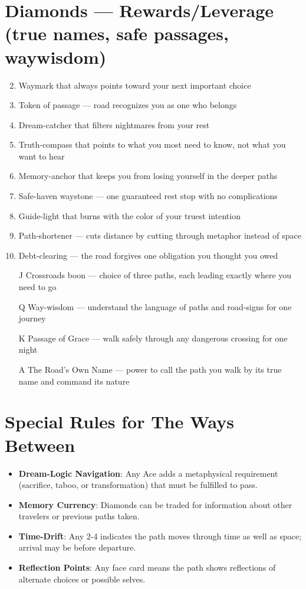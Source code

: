 \section*{Diamonds --- Rewards/Leverage (true names, safe passages, waywisdom)}
\begin{enumerate}
\setcounter{enumi}{1}
\item Waymark that always points toward your next important choice
\item Token of passage --- road recognizes you as one who belongs
\item Dream-catcher that filters nightmares from your rest
\item Truth-compass that points to what you most need to know, not what you want to hear
\item Memory-anchor that keeps you from losing yourself in the deeper paths
\item Safe-haven waystone --- one guaranteed rest stop with no complications
\item Guide-light that burns with the color of your truest intention
\item Path-shortener --- cuts distance by cutting through metaphor instead of space
\item Debt-clearing --- the road forgives one obligation you thought you owed
\item[J] Crossroads boon --- choice of three paths, each leading exactly where you need to go
\item[Q] Way-wisdom --- understand the language of paths and road-signs for one journey
\item[K] Passage of Grace --- walk safely through any dangerous crossing for one night
\item[A] The Road's Own Name --- power to call the path you walk by its true name and command its nature
\end{enumerate}

\section*{Special Rules for The Ways Between}
\begin{itemize}
\item \textbf{Dream-Logic Navigation}: Any Ace adds a metaphysical requirement (sacrifice, taboo, or transformation) that must be fulfilled to pass.
\item \textbf{Memory Currency}: Diamonds can be traded for information about other travelers or previous paths taken.
\item \textbf{Time-Drift}: Any 2-4 indicates the path moves through time as well as space; arrival may be before departure.
\item \textbf{Reflection Points}: Any face card means the path shows reflections of alternate choices or possible selves.
\end{itemize}

